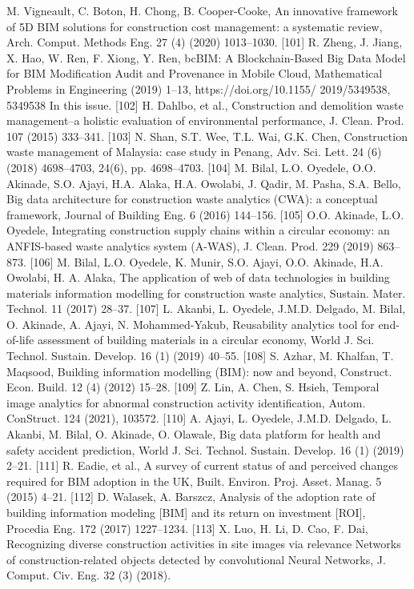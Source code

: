 \documentclass[towcolumn, 11pt]{Article}
\begin{document}
\begin{چکیده}
[100] M. Vigneault, C. Boton, H. Chong, B. Cooper-Cooke, An innovative framework of 5D BIM solutions for construction cost management: a systematic review, Arch. Comput. Methods Eng. 27 (4) (2020) 1013–1030. 
[101] R. Zheng, J. Jiang, X. Hao, W. Ren, F. Xiong, Y. Ren, bcBIM: A Blockchain-Based Big Data Model for BIM Modification Audit and Provenance in Mobile Cloud, Mathematical Problems in Engineering (2019) 1–13, https://doi.org/10.1155/ 2019/5349538, 5349538 In this issue. 
[102] H. Dahlbo, et al., Construction and demolition waste management–a holistic evaluation of environmental performance, J. Clean. Prod. 107 (2015) 333–341. 
[103] N. Shan, S.T. Wee, T.L. Wai, G.K. Chen, Construction waste management of Malaysia: case study in Penang, Adv. Sci. Lett. 24 (6) (2018) 4698–4703, 24(6), pp. 4698–4703.
[104] M. Bilal, L.O. Oyedele, O.O. Akinade, S.O. Ajayi, H.A. Alaka, H.A. Owolabi, J. Qadir, M. Pasha, S.A. Bello, Big data architecture for construction waste analytics (CWA): a conceptual framework, Journal of Building Eng. 6 (2016) 144–156. 
[105] O.O. Akinade, L.O. Oyedele, Integrating construction supply chains within a circular economy: an ANFIS-based waste analytics system (A-WAS), J. Clean. Prod. 229 (2019) 863–873. 
[106] M. Bilal, L.O. Oyedele, K. Munir, S.O. Ajayi, O.O. Akinade, H.A. Owolabi, H. A. Alaka, The application of web of data technologies in building materials information modelling for construction waste analytics, Sustain. Mater. Technol. 11 (2017) 28–37. 
[107] L. Akanbi, L. Oyedele, J.M.D. Delgado, M. Bilal, O. Akinade, A. Ajayi, N. Mohammed-Yakub, Reusability analytics tool for end-of-life assessment of building materials in a circular economy, World J. Sci. Technol. Sustain. Develop. 16 (1) (2019) 40–55. 
[108] S. Azhar, M. Khalfan, T. Maqsood, Building information modelling (BIM): now and beyond, Construct. Econ. Build. 12 (4) (2012) 15–28. 
[109] Z. Lin, A. Chen, S. Hsieh, Temporal image analytics for abnormal construction activity identification, Autom. ConStruct. 124 (2021), 103572. 
[110] A. Ajayi, L. Oyedele, J.M.D. Delgado, L. Akanbi, M. Bilal, O. Akinade, O. Olawale, Big data platform for health and safety accident prediction, World J. Sci. Technol. Sustain. Develop. 16 (1) (2019) 2–21. 
[111] R. Eadie, et al., A survey of current status of and perceived changes required for BIM adoption in the UK, Built. Environ. Proj. Asset. Manag. 5 (2015) 4–21. 
[112] D. Walasek, A. Barszcz, Analysis of the adoption rate of building information modeling [BIM] and its return on investment [ROI], Procedia Eng. 172 (2017) 1227–1234. 
[113] X. Luo, H. Li, D. Cao, F. Dai, Recognizing diverse construction activities in site images via relevance Networks of construction-related objects detected by convolutional Neural Networks, J. Comput. Civ. Eng. 32 (3) (2018). 

\end{چکیده}
\end{document}
